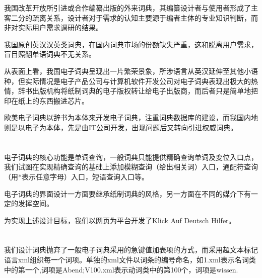 \documentclass[12pt,twocolumn]{article}
\begin{document}
\title{\textbf{}} 
\author{}

\maketitle
\large
\twocolumn
\setlength{\columnseprule}{1pt}
\section{\textbf{}}
我国改革开放所引进或合作编纂出版的外来词典，其编纂设计者与使用者形成了主客二分的疏离关系，设计者对于需求的认知主要源于编者主体的专业知识判断，而非对实际用户需求调研的结果。\cite{Bib1}

我国原创英汉汉英类词典，在国内词典市场的份额缺失严重，这和脱离用户需求，盲目照翻单语词典不无关系。

从表面上看，我国电子词典呈现出一片繁荣景象，所涉语言从英汉延伸至其他小语种，但实际情况是电子产品公司与计算机软件开发公司对电子词典表现出极大的热情，辞书出版机构将纸制词典的电子版权转让给电子出版商，而后者只是简单地把印在纸上的东西搬进芯片。

欧美电子词典以辞书为本体来开发电子词典，注重词典数据库的建设，而我国内地则是以电子为本体，先是由IT公司开发，出现问题后又转向引进权威词典。\cite{Bib2}

\section{\textbf{}}
	电子词典的核心功能是单词查询，一般词典只能提供精确查询单词及变位入口点，我们试图在实现精确查询的基础上添加模糊查询（给出相关词）入口，通配符查询（用*表示任意字母）入口，短语查询入口等。
	
	电子词典的界面设计一方面要继承纸制词典的风格，另一方面在不同的媒介下有一定的发挥空间。

	为实现上述设计目标，我们以网页为平台开发了Klick Auf Deutsch Hilfer。
	
\section{\textbf{}}

\subsection{\textbf{}}
	我们设计词典抛弃了一般电子词典采用的急键值加表项的方式，而采用超文本标记语言xml组织每一个词项。单独的xml文件以词条的编号命名，如1.xml表示名词类中的第一个,词项是Abend;V100.xml表示动词类中的第100个，词项是wissen.
	
\end{document}
